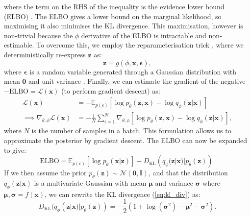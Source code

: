 where the term on the RHS of the inequality is the evidence lower bound (ELBO) \cite{kingma_auto-encoding_2022}. The ELBO gives a lower bound on the marginal likelihood, so maximising it also minimises the KL divergence. This maximisation, however is non-trivial because the $\phi$ derivative of the ELBO is intractable and non-estimable. To overcome this, we employ the reparameterisation trick \cite{kingma_introduction_2019}, where we deterministically re-express $\boldsymbol{z}$ as:
\begin{equation}
    \boldsymbol{z} = g(\phi, \boldsymbol{x},\boldsymbol{\epsilon}),
\end{equation}
where $\boldsymbol{\epsilon}$ is a random variable generated through a Gaussian distribution with mean $\boldsymbol{0}$ and unit variance \cite{kingma_auto-encoding_2022}. Finally, we can estimate the gradient of the negative $-\text{ELBO}=\mathcal L(\boldsymbol{x})$ (to perform gradient descent) as:
\begin{align}
    \mathcal L(\boldsymbol{x}) &= -\mathbb{E}_{p(\epsilon)}\left[\log p_\theta(\boldsymbol{z}, \boldsymbol{x})-\log q_\phi(\boldsymbol{z}|\boldsymbol{x})\right]\\
    \implies \nabla_{\theta, \phi}\mathcal L(\boldsymbol{x})&=-\frac{1}{N}\sum_{i=1}^N\nabla_{\theta,\phi}\left[\log p_\theta(\boldsymbol{z}, \boldsymbol{x})-\log q_\phi(\boldsymbol{z}|\boldsymbol{x})\right],
\end{align}
where $N$ is the number of samples in a batch. This formulation allows us to approximate the posterior by gradient descent. The ELBO can now be expanded to give: 
\begin{equation}
    \text{ELBO} = \mathbb{E}_{p(\epsilon)}\left[\log p_\theta(\boldsymbol{x}|\boldsymbol{z})\right]-D_\text{KL}\left(q_\phi(\boldsymbol{z}|\boldsymbol{x})|p_\theta(\boldsymbol{z})\right).
\end{equation}
If we then assume the prior $p_\theta(\boldsymbol{z})\sim\mathcal{N}(\boldsymbol{0},\boldsymbol{I})$, and that the distribution $q_\phi(\boldsymbol{z}|\boldsymbol{x})$ is a multivariate Gaussian with mean $\boldsymbol{\mu}$ and variance $\boldsymbol{\sigma}$ where $\boldsymbol{\mu}, \boldsymbol{\sigma}=f(\boldsymbol{x})$, we can rewrite the KL divergence (\ref{eq:kl_div}) as: 
\begin{equation}
    D_\text{KL}(q_\phi(\boldsymbol{z}|\boldsymbol{x})|p_\theta(\boldsymbol{z}))=-\frac{1}{2} \left(1+\log(\boldsymbol{\sigma}^2)-\boldsymbol{\mu}^2-\boldsymbol{\sigma}^2\right).
\end{equation}
